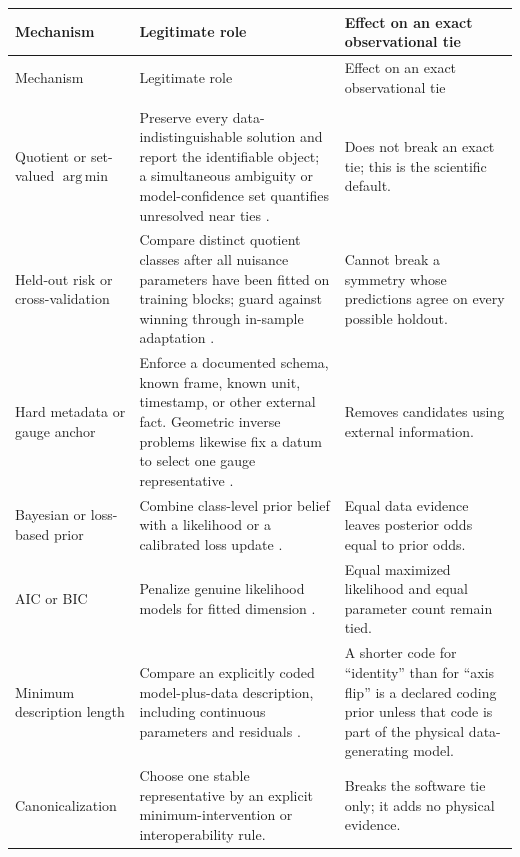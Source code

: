 \documentclass[11pt]{article}
\newcommand{\argmin}{\operatorname*{arg\,min}}
\begin{document}
    \begingroup
    \small
    \setlength{\tabcolsep}{4pt}
    \setlength{\LTleft}{0pt}
    \setlength{\LTright}{0pt}
    \begin{longtable}{@{}>{\raggedright\arraybackslash}p{}>{\raggedright\arraybackslash}p{}>{\raggedright\arraybackslash}p{}@{}}
        \toprule
        Mechanism & Legitimate role & Effect on an exact observational tie \\
        \midrule
        \endfirsthead
        \toprule
        Mechanism & Legitimate role & Effect on an exact observational tie \\
        \midrule
        \endhead
        \midrule
        \multicolumn{3}{r}{\emph{Continued on next page}}\\
        \endfoot
        \bottomrule
        \endlastfoot
        Quotient or set-valued $\argmin$
        & Preserve every data-indistinguishable solution and report the identifiable object;
        a simultaneous ambiguity or model-confidence set quantifies unresolved near ties
        \cite{hansen2011}.
        & Does not break an exact tie; this is the scientific default. \\
        Held-out risk or cross-validation
        & Compare distinct quotient classes after all nuisance parameters have been fitted on
        training blocks; guard against winning through in-sample adaptation \cite{stone1974}.
        & Cannot break a symmetry whose predictions agree on every possible holdout. \\
        Hard metadata or gauge anchor
        & Enforce a documented schema, known frame, known unit, timestamp, or other external
        fact. Geometric inverse problems likewise fix a datum to select one gauge representative
        \cite{triggs2000}.
        & Removes candidates using external information. \\
        Bayesian or loss-based prior
        & Combine class-level prior belief with a likelihood or a calibrated loss update
        \cite{kass1995,bissiri2016}.
        & Equal data evidence leaves posterior odds equal to prior odds. \\
        AIC or BIC
        & Penalize genuine likelihood models for fitted dimension
        \cite{akaike1974,schwarz1978}.
        & Equal maximized likelihood and equal parameter count remain tied. \\
        Minimum description length
        & Compare an explicitly coded model-plus-data description, including continuous
        parameters and residuals \cite{rissanen1978}.
        & A shorter code for ``identity'' than for ``axis flip'' is a declared coding prior unless
        that code is part of the physical data-generating model. \\
        Canonicalization
        & Choose one stable representative by an explicit minimum-intervention or
        interoperability rule.
        & Breaks the software tie only; it adds no physical evidence. \\
    \end{longtable}
    \endgroup
\end{document}
